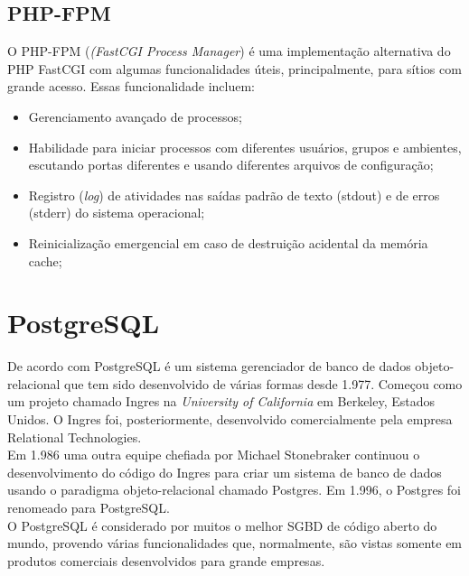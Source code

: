 \subsection{PHP-FPM}
O PHP-FPM (\textit{(FastCGI Process Manager}) é uma implementação alternativa do PHP FastCGI com algumas funcionalidades úteis, principalmente, para sítios com grande acesso. Essas funcionalidade incluem:
\begin{itemize}
	\item Gerenciamento avançado de processos;
	\item Habilidade para iniciar processos com diferentes usuários, grupos e ambientes, escutando portas diferentes e usando diferentes arquivos de configuração;
	\item Registro (\textit{log}) de atividades nas saídas padrão de texto 
	(stdout) e de erros (stderr) do sistema operacional;
	\item Reinicialização emergencial em caso de destruição acidental da memória cache;
\end{itemize}
\section{PostgreSQL}
De acordo com  PostgreSQL é um sistema gerenciador de banco de dados objeto-relacional que tem sido desenvolvido de várias formas desde 1.977. Começou como um projeto chamado Ingres na \textit{University of California} em Berkeley, Estados Unidos. O Ingres foi, posteriormente, desenvolvido comercialmente pela empresa Relational Technologies.\\
Em 1.986 uma outra equipe chefiada por Michael Stonebraker continuou o desenvolvimento do código do Ingres para criar um sistema de banco de dados usando o paradigma objeto-relacional chamado Postgres. Em 1.996, o Postgres foi renomeado para PostgreSQL.\\
O PostgreSQL é considerado por muitos o melhor SGBD de código aberto do mundo, 
provendo várias funcionalidades que, normalmente, são vistas somente em 
produtos comerciais desenvolvidos para grande empresas.\\
